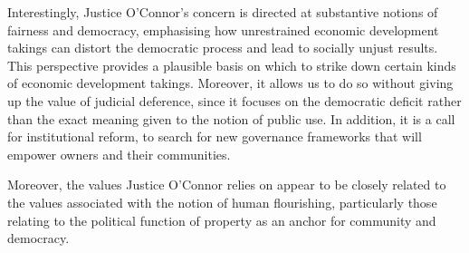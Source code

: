 Interestingly, Justice O'Connor's concern is directed at substantive notions of fairness and democracy, emphasising how unrestrained economic development takings can distort the democratic process and lead to socially unjust results. This perspective provides a plausible basis on which to strike down certain kinds of economic development takings. Moreover, it allows us to do so without giving up the value of judicial deference, since it focuses on the democratic deficit rather than the exact meaning given to the notion of public use. In addition, it is a call for institutional reform, to search for new governance frameworks that will empower owners and their communities.

Moreover, the values Justice O'Connor relies on appear to be closely related to the values associated with the notion of human flourishing, particularly those relating to the political function of property as an anchor for community and democracy. 

